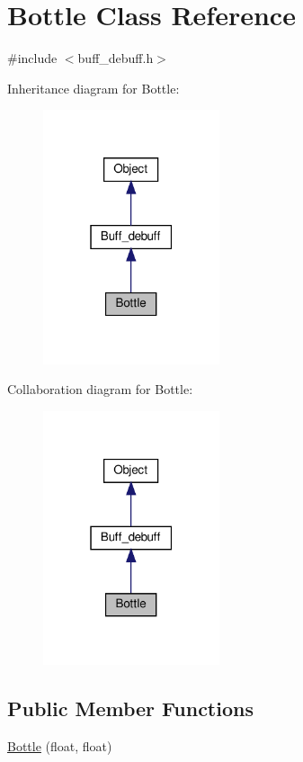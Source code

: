 \hypertarget{classBottle}{}\section{Bottle Class Reference}
\label{classBottle}


{\ttfamily \#include $<$buff\+\_\+debuff.\+h$>$}



Inheritance diagram for Bottle\+:\nopagebreak
\begin{figure}[H]
\begin{center}
\leavevmode
\includegraphics[width=147pt]{classBottle__inherit__graph}
\end{center}
\end{figure}


Collaboration diagram for Bottle\+:\nopagebreak
\begin{figure}[H]
\begin{center}
\leavevmode
\includegraphics[width=147pt]{classBottle__coll__graph}
\end{center}
\end{figure}
\subsection*{Public Member Functions}
\begin{DoxyCompactItemize}
\item 
\hyperlink{classBottle_aabe46dbc52bfd8cf2a0088d96f86a767}{Bottle} (float, float)
\end{DoxyCompactItemize}
